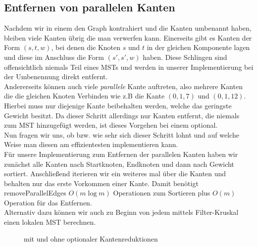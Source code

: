 \subsection{Entfernen von parallelen Kanten}\label{remove-Section}
Nachdem wir in einem \boruvkaStep den Graph kontrahiert und die Kanten umbenannt haben, bleiben viele Kanten übrig die man verwerfen kann. Einerseits gibt es Kanten der Form $(s,t,w)$, bei denen die Knoten $s$ und $t$ in der gleichen Komponente lagen und diese im Anschluss die Form $(s',s',w)$ haben. Diese Schlingen sind offensichtlich niemals Teil eines MSTs und werden in unserer Implementierung bei der Umbenennung direkt entfernt.\\
Andererseits können auch viele \emph{parallele} Kante auftreten, also mehrere Kanten die die gleichen Knoten Verbinden wie z.B die Kante $(0,1,7)$ und $(0,1,12)$. Hierbei muss nur diejenige Kante beibehalten werden, welche das geringste Gewicht besitzt. Da dieser Schritt allerdings nur Kanten entfernt, die niemals zum MST hinzugefügt werden, ist dieses Vorgehen bei einem \boruvkaStep optional. \\
Nun fragen wir uns, ob bzw. wie sehr sich dieser Schritt lohnt und auf welche Weise man diesen am effizientesten implementieren kann.\\
Für unsere Implementierung zum Entfernen der parallelen Kanten haben wir zunächst alle Kanten nach Startknoten, Endknoten und dann nach Gewicht sortiert. Anschließend iterieren wir ein weiteres mal über die Kanten und behalten nur das erste Vorkommen einer Kante. Damit benötigt removeParallelEdges $O(m\log m)$ Operationen zum Sortieren plus $O(m)$ Operation für das Entfernen.\\
Alternativ dazu können wir auch zu Beginn von jedem \boruvkaStep mittels Filter-Kruskal einen lokalen MST berechnen.\\


\begin{figure}[H]
    \centering
    
    
    
    \caption{\boruvkaAllreduce mit und ohne optionaler Kantenreduktionen}
    \label{RemoveParallel-Img}
\end{figure}

